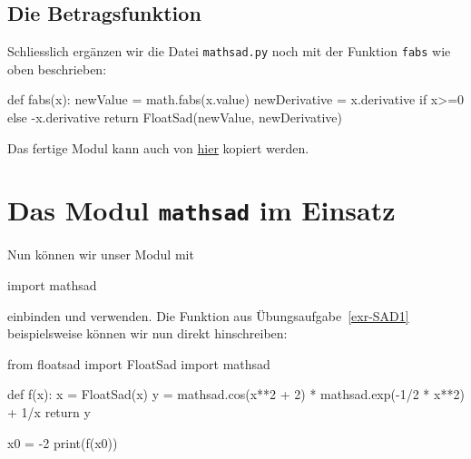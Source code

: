 \documentclass[
  letterpaper,
  DIV=11,
  oneside]{scrreprt}
\newenvironment{Shaded}{\begin{snugshade}}{\end{snugshade}}
\newcommand{\BuiltInTok}[1]{\textcolor[rgb]{0.00,0.23,0.31}{#1}}
\newcommand{\ControlFlowTok}[1]{\textcolor[rgb]{0.00,0.23,0.31}{#1}}
\newcommand{\DecValTok}[1]{\textcolor[rgb]{0.68,0.00,0.00}{#1}}
\newcommand{\ImportTok}[1]{\textcolor[rgb]{0.00,0.46,0.62}{#1}}
\newcommand{\KeywordTok}[1]{\textcolor[rgb]{0.00,0.23,0.31}{#1}}
\newcommand{\NormalTok}[1]{\textcolor[rgb]{0.00,0.23,0.31}{#1}}
\newcommand{\OperatorTok}[1]{\textcolor[rgb]{0.37,0.37,0.37}{#1}}
\theoremstyle{definition}
\theoremstyle{definition}
\theoremstyle{remark}
\begin{document}
\hypertarget{die-betragsfunktion}{%
\subsection{Die Betragsfunktion}\label{die-betragsfunktion}}

Schliesslich ergänzen wir die Datei \texttt{mathsad.py} noch mit der
Funktion \texttt{fabs} wie oben beschrieben:

\begin{Shaded}
\begin{Highlighting}[]
\KeywordTok{def}\NormalTok{ fabs(x):}
\NormalTok{    newValue }\OperatorTok{=}\NormalTok{ math.fabs(x.value)}
\NormalTok{    newDerivative }\OperatorTok{=}\NormalTok{ x.derivative }\ControlFlowTok{if}\NormalTok{ x}\OperatorTok{\textgreater{}=}\DecValTok{0} \ControlFlowTok{else} \OperatorTok{{-}}\NormalTok{x.derivative}
    \ControlFlowTok{return}\NormalTok{ FloatSad(newValue, newDerivative)}
\end{Highlighting}
\end{Shaded}

Das fertige Modul kann auch von \href{mathsad.py}{hier} kopiert werden.

\hypertarget{das-modul-mathsad-im-einsatz}{%
\section{\texorpdfstring{Das Modul \texttt{mathsad} im
Einsatz}{Das Modul mathsad im Einsatz}}\label{das-modul-mathsad-im-einsatz}}

Nun können wir unser Modul mit

\begin{Shaded}
\begin{Highlighting}[]
\ImportTok{import}\NormalTok{ mathsad}
\end{Highlighting}
\end{Shaded}

einbinden und verwenden. Die Funktion aus Übungsaufgabe~\ref{exr-SAD1}
beispielsweise können wir nun direkt hinschreiben:

\begin{Shaded}
\begin{Highlighting}[]
\ImportTok{from}\NormalTok{ floatsad }\ImportTok{import}\NormalTok{ FloatSad}
\ImportTok{import}\NormalTok{ mathsad}

\KeywordTok{def}\NormalTok{ f(x):}
\NormalTok{    x }\OperatorTok{=}\NormalTok{ FloatSad(x)}
\NormalTok{    y }\OperatorTok{=}\NormalTok{ mathsad.cos(x}\OperatorTok{**}\DecValTok{2} \OperatorTok{+} \DecValTok{2}\NormalTok{) }\OperatorTok{*}\NormalTok{ mathsad.exp(}\OperatorTok{{-}}\DecValTok{1}\OperatorTok{/}\DecValTok{2} \OperatorTok{*}\NormalTok{ x}\OperatorTok{**}\DecValTok{2}\NormalTok{) }\OperatorTok{+} \DecValTok{1}\OperatorTok{/}\NormalTok{x}
    \ControlFlowTok{return}\NormalTok{ y}

\NormalTok{x0 }\OperatorTok{=} \OperatorTok{{-}}\DecValTok{2}
\BuiltInTok{print}\NormalTok{(f(x0))}
\end{Highlighting}
\end{Shaded}
\end{document}
